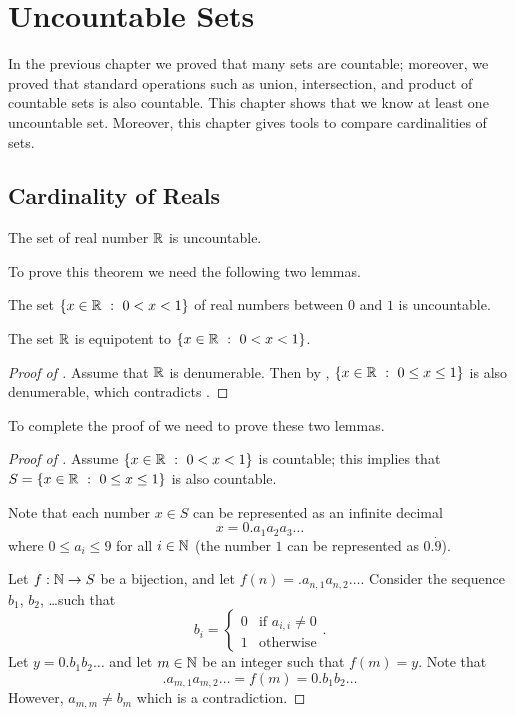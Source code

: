 \chapter{Uncountable Sets}

In the previous chapter we proved that many sets are countable; moreover, we
proved that standard operations such as union, intersection, and product of
countable sets is also countable. This chapter shows that we know at least one
uncountable set. Moreover, this chapter gives tools to compare cardinalities of
sets.

\section{Cardinality of Reals}
\begin{theorem}[Cantor]
\label{theorem:reals-are-uncountable}
  The set of real number ${\mathbb{R}}$ is uncountable.
\end{theorem}

To prove this theorem we need the following two lemmas.
\begin{lemma}
\label{lemma:segment-is-uncountable}
  The set $\set[0 < x < 1]{x \in \R}$ of real numbers between $0$ and $1$ is
  uncountable.
\end{lemma}

\begin{lemma}
\label{lemma:segment-equipotent-to-reals}
  The set ${\mathbb{R}}$ is equipotent to $\set[0 < x < 1]{x \in \R}$.
\end{lemma}

\begin{proof}[Proof of ]
  Assume that ${\mathbb{R}}$ is denumerable. Then by
  ,
  $\set[0 \le x \le 1]{x \in \R}$ is also denumerable, which contradicts
  .
\end{proof}

To complete the proof of  we need to prove
these two lemmas.
\begin{proof}[Proof of ]
  Assume $\set[0 < x < 1]{x \in \R}$ is countable; this implies that 
  $S = \set[0 \le x \le 1]{x \in \R}$ is also countable. 

  Note that each number $x \in S$ can be represented as an infinite decimal 
  \[
    x = 0.a_1 a_2 a_3 \dots
  \]
  where $0 \le a_i \le 9$ for all $i \in {\mathbb{N}}$ (the number $1$ can be represented
  as $0.\dot{9}$).

  Let $f : {\mathbb{N}} \to S$ be a bijection, and let $f(n) = .a_{n, 1} a_{n, 2} \dots$.
  Consider the sequence $b_1$, $b_2$, \dots such that 
  \[
    b_i = 
    \begin{cases}
      0 & \text{if } a_{i, i} \neq 0 \\
      1 & \text{otherwise}
    \end{cases}.
  \]
  Let $y = 0.b_1 b_2 \dots$ and let $m \in {\mathbb{N}}$ be an integer such that $f(m) =
  y$. Note that 
  \[
    .a_{m, 1} a_{m, 2} \dots = f(m) =  0.b_1 b_2 \dots
  \]
  However, $a_{m, m} \neq b_m$ which is a contradiction.
\end{proof}

